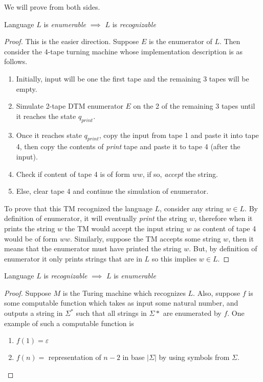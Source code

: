\begin{soln}
We will prove from both sides.
\begin{claim}
Language $L$ is \emph{enumerable} $\implies$ $L$ is \emph{recognizable}
\end{claim}
\begin{proof}
This is the easier direction. Suppose $E$ is the enumerator of $L$. Then consider the 4-tape turning machine whose implementation description is as follows.
\begin{enumerate}
    \item Initially, input will be one the first tape and the remaining 3 tapes will be empty.
    \item Simulate 2-tape DTM enumerator $E$ on the 2 of the remaining 3 tapes until it reaches the state $q_{print}$.
    \item Once it reaches state $q_{print}$, copy the input from tape 1 and paste it into tape 4, then copy the contents of \emph{print} tape and paste it to tape 4 (after the input).
    \item Check if content of tape 4 is of form $w w$, if so, \emph{accept} the string.
    \item Else, clear tape 4 and continue the simulation of enumerator.
\end{enumerate}
To prove that this TM recognized the language $L$, consider any string $w \in L$. By definition of enumerator, it will eventually \emph{print} the string $w$, therefore when it prints the string $w$ the TM would accept the input string $w$ as content of tape 4 would be of form $w w$. Similarly, suppose the TM accepts some string $w$, then it means that the enumerator must have printed the string $w$. But, by definition of enumerator it only prints strings that are in $L$ so this implies $w \in L$.
\end{proof}

\begin{claim}
Language $L$ is \emph{recognizable} $\implies$ $L$ is \emph{enumerable}
\end{claim}
\begin{proof}
Suppose $M$ is the Turing machine which recognizes $L$. Also, suppose $f$ is some computable function which takes as input some natural number, and outputs a string in $\Sigma^*$ such that all strings in $\Sigma*$ are enumerated by $f$. One example of such a computable function is
\begin{enumerate}
    \item $f(1) = \varepsilon$
    \item $f(n) = $ representation of $n-2$ in base $|\Sigma|$ by using symbols from $\Sigma$.
\end{enumerate}


\end{proof}
\end{soln}
